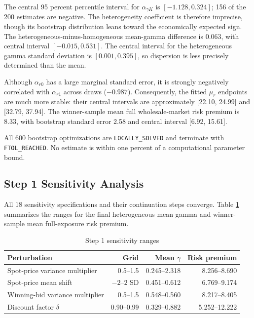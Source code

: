 \documentclass[10pt]{article}
\begin{document}
The central 95 percent percentile interval for $\alpha_{\gamma K}$ is
$[-1.128,0.324]$; 156 of the 200 estimates are negative. The heterogeneity
coefficient is therefore imprecise, though its bootstrap distribution leans
toward the economically expected sign. The heterogeneous-minus-homogeneous
mean-gamma difference is 0.063, with central interval $[-0.015,0.531]$.
The central interval for the heterogeneous gamma standard deviation is
$[0.001,0.395]$, so dispersion is less precisely determined than the mean.

Although $\alpha_{r0}$ has a large marginal standard error, it is strongly
negatively correlated with $\alpha_{r1}$ across draws ($-0.987$). Consequently,
the fitted $\mu_r$ endpoints are much more stable: their central intervals are
approximately [22.10, 24.99] and [32.79, 37.94]. The winner-sample mean full
wholesale-market risk premium is 8.33, with bootstrap standard error 2.58 and
central interval [6.92, 15.61].

All 600 bootstrap optimizations are \texttt{LOCALLY\_SOLVED} and terminate
with \texttt{FTOL\_REACHED}. No estimate is within one percent of a
computational parameter bound.

\subsection{Step 1 Sensitivity Analysis}

All 18 sensitivity specifications and their continuation steps converge. Table
\ref{tab:step1_sensitivity} summarizes the ranges for the final heterogeneous
mean gamma and winner-sample mean full-exposure risk premium.

\begin{table}[H]
\centering
\small
\caption{Step 1 sensitivity ranges}
\label{tab:step1_sensitivity}
\begin{tabular}{lrrr}
\toprule
Perturbation & Grid & Mean $\gamma$ & Risk premium\\
\midrule
Spot-price variance multiplier & 0.5--1.5 & 0.245--2.318 & 8.256--8.690\\
Spot-price mean shift & $-2$--$2$ SD & 0.451--0.612 & 6.769--9.174\\
Winning-bid variance multiplier & 0.5--1.5 & 0.548--0.560 & 8.217--8.405\\
Discount factor $\delta$ & 0.90--0.99 & 0.329--0.882 & 5.252--12.222\\
\bottomrule
\end{tabular}
\end{table}
\end{document}
